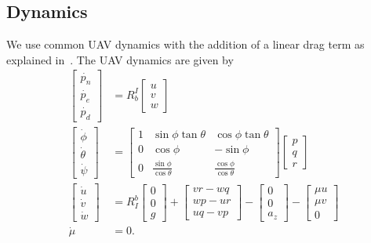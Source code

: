 \documentclass[a4paper]{article}
\begin{document}
\subsection{Dynamics}
We use common UAV dynamics with the addition of a linear drag term as explained
in~\cite{leishman2014accel}. The UAV dynamics are given by
\begin{align}
  \begin{bmatrix}
    \dot{p_n} \\
    \dot{p_e} \\
    \dot{p_d}
  \end{bmatrix}
  &=
  R_b^I
  \begin{bmatrix}
    u \\
    v \\
    w
  \end{bmatrix}
  \\
  \begin{bmatrix}
    \dot{\phi} \\
    \dot{\theta} \\
    \dot{\psi}
  \end{bmatrix}
  &=
  \begin{bmatrix}
    1 & \sin\phi\tan\theta & \cos\phi\tan\theta \\
    0 & \cos\phi & -\sin\phi \\
    0 & \frac{\sin\phi}{\cos\theta} & \frac{\cos\phi}{\cos\theta}
  \end{bmatrix}
  \begin{bmatrix}
    p \\
    q \\
    r 
  \end{bmatrix}
  \\
  \begin{bmatrix}
    \dot{u} \\
    \dot{v} \\
    \dot{w}
  \end{bmatrix}
  &=
  R_I^b
  \begin{bmatrix}
    0 \\
    0 \\
    g
  \end{bmatrix}
  +
  \begin{bmatrix}
    vr - wq \\
    wp - ur \\
    uq - vp
  \end{bmatrix}
  -
  \begin{bmatrix}
    0 \\
    0 \\
    a_z
  \end{bmatrix}
  -
  \begin{bmatrix}
    \mu u \\
    \mu v \\
    0
  \end{bmatrix}
  \\
  \dot{\mu} &= 0.
\end{align}
\end{document}
